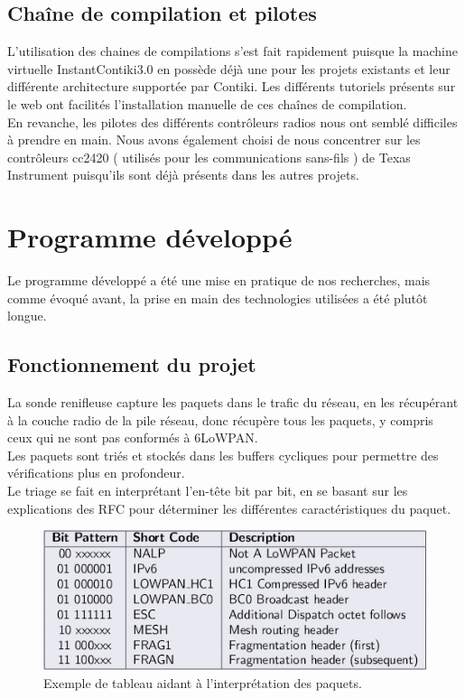 	\subsection{Chaîne de compilation et pilotes}
	L'utilisation des chaines de compilations s'est fait rapidement puisque la machine virtuelle InstantContiki3.0 en possède déjà une pour les projets existants et leur différente architecture supportée par Contiki. Les différents tutoriels présents sur le web ont facilités l'installation manuelle de ces chaînes de compilation.\\
	En revanche, les pilotes des différents contrôleurs radios nous ont semblé difficiles à prendre en main. Nous avons également choisi de nous concentrer sur les contrôleurs cc2420 ( utilisés pour les communications sans-fils ) de Texas Instrument puisqu'ils sont déjà présents dans les autres projets.

\section{Programme développé}
	Le programme développé a été une mise en pratique de nos recherches, mais comme évoqué avant, la prise en main des technologies utilisées a été plutôt longue.
	\subsection{Fonctionnement du projet}
		La sonde renifleuse capture les paquets dans le trafic du réseau, en les récupérant à la couche radio de la pile réseau, donc récupère tous les paquets, y compris ceux qui ne sont pas conformés à 6LoWPAN.\\
		Les paquets sont triés et stockés dans les buffers cycliques pour permettre des vérifications plus en profondeur.\\
		Le triage se fait en interprétant l'en-tête bit par bit, en se basant sur les explications des RFC pour déterminer les différentes caractéristiques du paquet.
		\begin{figure}[htp]
			\centering
			\includegraphics[width=15cm]{images/parsing}
			\caption{Exemple de tableau aidant à l'interprétation des paquets.}
			\label{fig:parsing}
		\end{figure}
